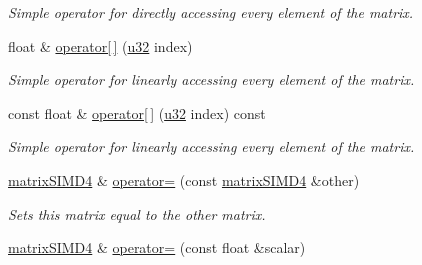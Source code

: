 \begin{DoxyCompactItemize}
\begin{DoxyCompactList}\small\item\em Simple operator for directly accessing every element of the matrix. \end{DoxyCompactList}\item 
float \& \hyperlink{classirr_1_1core_1_1matrixSIMD4_a76676eebdf216b41ccb445622fe0a40a}{operator\mbox{[}$\,$\mbox{]}} (\hyperlink{namespaceirr_a0416a53257075833e7002efd0a18e804}{u32} index)\hypertarget{classirr_1_1core_1_1matrixSIMD4_a76676eebdf216b41ccb445622fe0a40a}{}\label{classirr_1_1core_1_1matrixSIMD4_a76676eebdf216b41ccb445622fe0a40a}

\begin{DoxyCompactList}\small\item\em Simple operator for linearly accessing every element of the matrix. \end{DoxyCompactList}\item 
const float \& \hyperlink{classirr_1_1core_1_1matrixSIMD4_a614f53023b261b4773f6c632fcc93dbe}{operator\mbox{[}$\,$\mbox{]}} (\hyperlink{namespaceirr_a0416a53257075833e7002efd0a18e804}{u32} index) const \hypertarget{classirr_1_1core_1_1matrixSIMD4_a614f53023b261b4773f6c632fcc93dbe}{}\label{classirr_1_1core_1_1matrixSIMD4_a614f53023b261b4773f6c632fcc93dbe}

\begin{DoxyCompactList}\small\item\em Simple operator for linearly accessing every element of the matrix. \end{DoxyCompactList}\item 
\hyperlink{classirr_1_1core_1_1matrixSIMD4}{matrix\+S\+I\+M\+D4} \& \hyperlink{classirr_1_1core_1_1matrixSIMD4_a1e1f5dd9f97e06168ac7e253e419e82c}{operator=} (const \hyperlink{classirr_1_1core_1_1matrixSIMD4}{matrix\+S\+I\+M\+D4} \&other)\hypertarget{classirr_1_1core_1_1matrixSIMD4_a1e1f5dd9f97e06168ac7e253e419e82c}{}\label{classirr_1_1core_1_1matrixSIMD4_a1e1f5dd9f97e06168ac7e253e419e82c}

\begin{DoxyCompactList}\small\item\em Sets this matrix equal to the other matrix. \end{DoxyCompactList}\item 
\hyperlink{classirr_1_1core_1_1matrixSIMD4}{matrix\+S\+I\+M\+D4} \& \hyperlink{classirr_1_1core_1_1matrixSIMD4_a6e8b2cafe9e1497116995067b647a9c9}{operator=} (const float \&scalar)\hypertarget{classirr_1_1core_1_1matrixSIMD4_a6e8b2cafe9e1497116995067b647a9c9}{}\label{classirr_1_1core_1_1matrixSIMD4_a6e8b2cafe9e1497116995067b647a9c9}


\end{DoxyCompactItemize}
